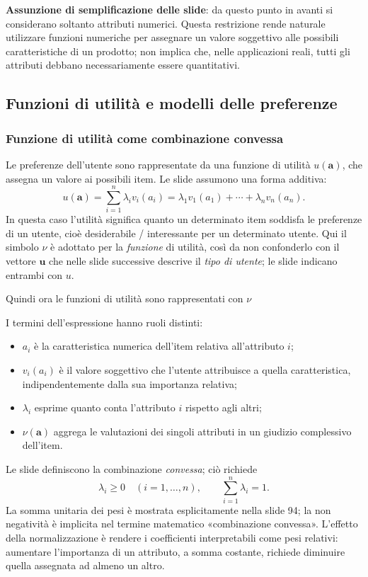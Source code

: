 \textbf{Assunzione di semplificazione delle slide}: da questo punto in avanti si considerano soltanto attributi numerici. Questa restrizione rende naturale utilizzare funzioni numeriche per assegnare un valore soggettivo alle possibili caratteristiche di un prodotto; non implica che, nelle applicazioni reali, tutti gli attributi debbano necessariamente essere quantitativi.

\subsection{Funzioni di utilità e modelli delle preferenze}

\subsubsection{Funzione di utilità come combinazione convessa}
Le preferenze dell'utente sono rappresentate da una funzione di utilità $u(\mathbf a)$, che assegna un valore ai possibili item. Le slide assumono una forma additiva:
\[
\boxed{
u(\mathbf a)=\sum_{i=1}^{n}\lambda_i v_i(a_i)
=\lambda_1v_1(a_1)+\cdots+\lambda_nv_n(a_n).}
\]
In questa caso l'utilità significa quanto un determinato item soddisfa le preferenze di un utente, cioè desiderabile / interessante per un determinato utente.
Qui il simbolo $\nu$ è adottato per la \emph{funzione} di utilità, così da non confonderlo con il vettore $\mathbf u$ che nelle slide successive descrive il \emph{tipo di utente}; le slide indicano entrambi con $u$.
\begin{center}
    Quindi ora le funzioni di utilità sono rappresentati con $\nu$
\end{center}

I termini dell'espressione hanno ruoli distinti:
\begin{itemize}
    \item $a_i$ è la caratteristica numerica dell'item relativa all'attributo $i$;
    \item $v_i(a_i)$ è il valore soggettivo che l'utente attribuisce a quella caratteristica, indipendentemente dalla sua importanza relativa;
    \item $\lambda_i$ esprime quanto conta l'attributo $i$ rispetto agli altri;
    \item $\nu(\mathbf a)$ aggrega le valutazioni dei singoli attributi in un giudizio complessivo dell'item.
\end{itemize}
Le slide definiscono la combinazione \emph{convessa}; ciò richiede
\[
\lambda_i\geq0\quad(i=1,\ldots,n),
\qquad\sum_{i=1}^{n}\lambda_i=1.
\]
La somma unitaria dei pesi è mostrata esplicitamente nella slide 94; la non negatività è implicita nel termine matematico «combinazione convessa». L'effetto della normalizzazione è rendere i coefficienti interpretabili come pesi relativi: aumentare l'importanza di un attributo, a somma costante, richiede diminuire quella assegnata ad almeno un altro.

